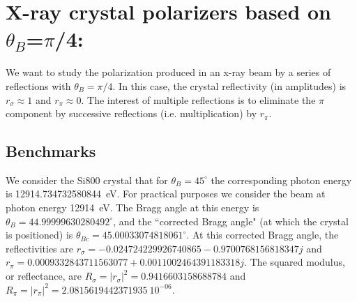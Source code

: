 \documentclass{iucr}
\begin{document}


\section{X-ray crystal polarizers based on $\theta_B$=$\pi$/4:}\label{sec:polarizers45deg}

We want to study the polarization produced in an x-ray beam by a series of reflections with $\theta_B=\pi/4$. In this case, the crystal reflectivity (in amplitudes) is $r_\sigma \approx 1$ and $r_\pi \approx 0$. The interest of multiple reflections is to eliminate the $\pi$ component by successive reflections (i.e. multiplication) by $r_\pi$. 

\subsection{Benchmarks}\label{sec:polarizers45degBenchmark}

We consider the Si800 crystal that for $\theta_B=45^{\circ}$ the corresponding photon energy is 12914.734732580844~eV. For practical purposes we consider the beam at photon energy 12914~eV. The Bragg angle at this energy is $\theta_B=44.99999630280492^{\circ}$, and the ``corrected Bragg angle" (at which the crystal is positioned) is $\theta_{Bc}=45.00033074818061^{\circ}$. At this corrected Bragg angle, the reflectivities are $r_\sigma=-0.024724229926740865-0.9700768156818347j$ and $r_\pi=0.0009332843711563077+0.0011002464391183318j$. The squared modulus, or reflectance, are $R_\sigma=|r_\sigma|^2=0.9416603158688784$ and 
$R_\pi=|r_\pi|^2=2.0815619442371935~10^{-06}$.
\end{document}
